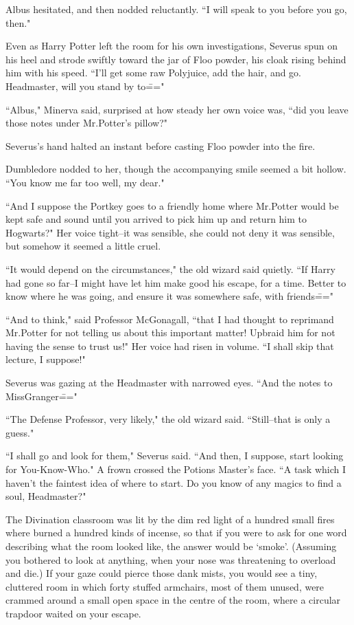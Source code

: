 Albus hesitated, and then nodded reluctantly. ``I will speak to you before you go, then."

\later

Even as Harry Potter left the room for his own investigations, Severus spun on his heel and strode swiftly toward the jar of Floo powder, his cloak rising behind him with his speed. ``I'll get some raw Polyjuice, add the hair, and go. Headmaster, will you stand by to\==="

``Albus," Minerva said, surprised at how steady her own voice was, ``did you leave those notes under Mr.\?Potter's pillow?"

Severus's hand halted an instant before casting Floo powder into the fire.

Dumbledore nodded to her, though the accompanying smile seemed a bit hollow. ``You know me far too well, my dear."

``And I suppose the Portkey goes to a friendly home where Mr.\?Potter would be kept safe and sound until you arrived to pick him up and return him to Hogwarts?" Her voice tight\---it was sensible, she could not deny it was sensible, but somehow it seemed a little cruel.

``It would depend on the circumstances," the old wizard said quietly. ``If Harry had gone so far\---I might have let him make good his escape, for a time. Better to know where he was going, and ensure it was somewhere safe, with friends\==="

``And to think," said Professor McGonagall, ``that I had thought to reprimand Mr.\?Potter for not telling us about this important matter! Upbraid him for not having the sense to trust us!" Her voice had risen in volume. ``I shall skip that lecture, I suppose!"

Severus was gazing at the Headmaster with narrowed eyes. ``And the notes to Miss\?Granger\==="

``The Defense Professor, very likely," the old wizard said. ``Still\---that is only a guess."

``I shall go and look for them," Severus said. ``And then, I suppose, start looking for You-Know-Who." A frown crossed the Potions Master's face. ``A task which I haven't the faintest idea of where to start. Do you know of any magics to find a soul, Headmaster?"

\later

The Divination classroom was lit by the dim red light of a hundred small fires where burned a hundred kinds of incense, so that if you were to ask for one word describing what the room looked like, the answer would be `smoke'. (Assuming you bothered to look at anything, when your nose was threatening to overload and die.) If your gaze could pierce those dank mists, you would see a tiny, cluttered room in which forty stuffed armchairs, most of them unused, were crammed around a small open space in the centre of the room, where a circular trapdoor waited on your escape.

